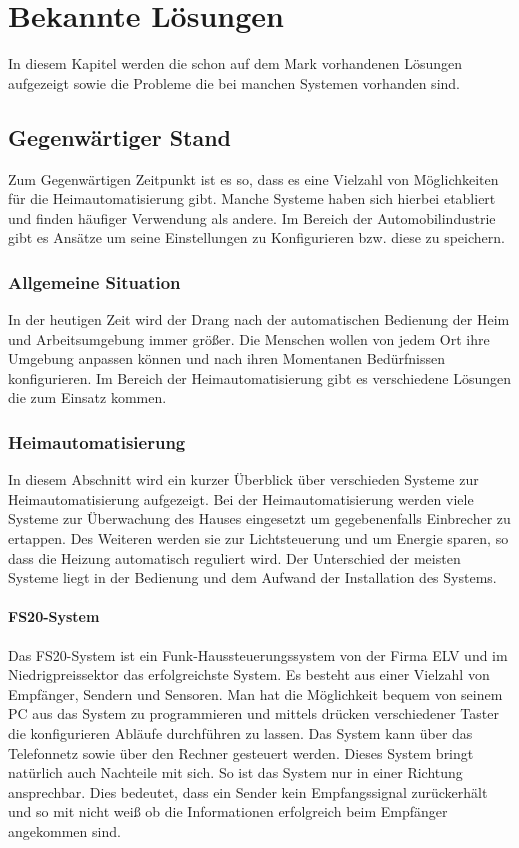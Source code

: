 \chapter{Bekannte Lösungen}
In diesem Kapitel werden die schon auf dem Mark vorhandenen Lösungen aufgezeigt sowie die Probleme die bei manchen Systemen vorhanden sind.

\section{Gegenwärtiger Stand}
Zum Gegenwärtigen Zeitpunkt ist es so, dass es eine Vielzahl von Möglichkeiten für die Heimautomatisierung gibt. 
Manche Systeme haben sich hierbei etabliert und finden häufiger Verwendung als andere. Im Bereich der Automobilindustrie gibt es Ansätze um seine Einstellungen zu Konfigurieren bzw. diese zu speichern.  

\subsection{Allgemeine Situation}
In der heutigen Zeit wird der Drang nach der automatischen Bedienung der Heim und Arbeitsumgebung immer größer. Die Menschen wollen von jedem Ort ihre Umgebung anpassen können und nach ihren Momentanen Bedürfnissen konfigurieren. Im Bereich der Heimautomatisierung gibt es verschiedene Lösungen die zum 
Einsatz kommen. 

\subsection{Heimautomatisierung}
In diesem Abschnitt wird ein kurzer Überblick über verschieden Systeme zur Heimautomatisierung aufgezeigt. Bei der Heimautomatisierung werden viele Systeme zur Überwachung des Hauses eingesetzt um gegebenenfalls Einbrecher zu ertappen. Des Weiteren werden sie zur Lichtsteuerung und um Energie sparen, so dass die Heizung automatisch reguliert wird. Der Unterschied der meisten Systeme liegt in der Bedienung und dem Aufwand der Installation des Systems.  

\subsubsection{FS20-System}
Das FS20-System ist ein Funk-Haussteuerungssystem von der Firma ELV und im Niedrigpreissektor das erfolgreichste System. Es besteht aus einer Vielzahl von Empfänger, Sendern und Sensoren. Man hat die Möglichkeit bequem von seinem PC aus das System zu programmieren und mittels drücken verschiedener Taster die konfigurieren Abläufe durchführen zu lassen. Das System kann über das Telefonnetz sowie über den Rechner gesteuert werden. Dieses System bringt natürlich auch Nachteile mit sich. So ist das System nur in einer Richtung ansprechbar. Dies bedeutet, dass ein Sender kein Empfangssignal zurückerhält 
und so mit nicht weiß ob die Informationen erfolgreich beim Empfänger angekommen sind. 

